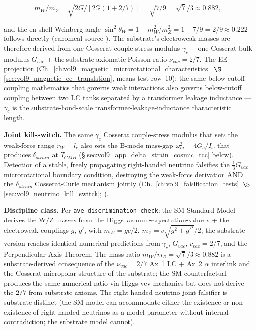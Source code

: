 \[
m_W/m_Z = \sqrt{2G/[2G(1+2/7)]} = \sqrt{7/9} = \sqrt{7}/3 \approx 0.882,
\]

and the on-shell Weinberg angle $\sin^2\theta_W = 1 - m_W^2/m_Z^2 = 1 - 7/9 = 2/9 \approx 0.222$ follows directly (canonical-source ). The substrate's electroweak masses are therefore derived from one Cosserat couple-stress modulus $\gamma_c$ + one Cosserat bulk modulus $G_{vac}$ + the substrate-axiomatic Poisson ratio $\nu_{vac} = 2/7$. The EE projection (Ch.~\ref{ch:vol9_magnetic_microrotational_characteristics}~$\S$\ref{sec:vol9_magnetic_ee_translation}, means-test row~10): the same below-cutoff coupling mathematics that governs weak interactions also governs below-cutoff coupling between two LC tanks separated by a transformer leakage inductance --- $\gamma_c$ is the substrate-bond-scale transformer-leakage-inductance characteristic length.

\textbf{Joint kill-switch.} The same $\gamma_c$ Cosserat couple-stress modulus that sets the weak-force range $r_W = l_c$ also sets the B-mode mass-gap $\omega_m^2 = 4 G_c/I_\omega$ that produces $\delta_{strain}$ at $T_{CMB}$ (\S\ref{sec:vol9_app_delta_strain_cosmic_tcc} below). Detection of a stable, freely propagating right-handed neutrino falsifies the $\tfrac{1}{3}G_{vac}$ microrotational boundary condition, destroying the weak-force derivation AND the $\delta_{strain}$ Cosserat-Curie mechanism jointly (Ch.~\ref{ch:vol9_falsification_tests}~$\S$\ref{sec:vol9_neutrino_kill_switch}; ).

\textbf{Discipline class.} Per \texttt{ave-discrimination-check}: the SM Standard Model derives the W/Z masses from the Higgs vacuum-expectation-value $v$ + the electroweak couplings $g$, $g'$, with $m_W = gv/2$, $m_Z = v\sqrt{g^2+g'^2}/2$; the substrate version reaches identical numerical predictions from $\gamma_c$, $G_{vac}$, $\nu_{vac} = 2/7$, and the Perpendicular Axis Theorem. The mass ratio $m_W/m_Z = \sqrt{7}/3 \approx 0.882$ is a substrate-derived consequence of the $\nu_{vac} = 2/7$ Ax~1 LC + Ax~2 $\alpha$ interlink and the Cosserat micropolar structure of the substrate; the SM counterfactual produces the same numerical ratio via Higgs vev mechanics but does not derive the $2/7$ from substrate axioms. The right-handed-neutrino joint-falsifier is substrate-distinct (the SM model can accommodate either the existence or non-existence of right-handed neutrinos as a model parameter without internal contradiction; the substrate model cannot).

